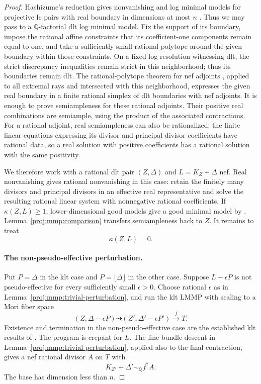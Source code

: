 \documentclass[11pt,letterpaper]{article}
\newcommand{\Q}{\mathbb{Q}}
\theoremstyle{definition}
\theoremstyle{remark}
\begin{document}
\begin{proof}
Hashizume's reduction gives nonvanishing and log minimal models
for projective lc pairs with real boundary in dimensions at most
\(n\) \cite[Theorem~1.4]{Proj-Hashizume2018}.
Thus we may pass to a \(\Q\)-factorial dlt log minimal model.
Fix the support of its boundary, impose the rational affine
constraints that its coefficient-one components remain equal
to one, and take a sufficiently small rational polytope around
the given boundary within those constraints. On a fixed log
resolution witnessing dlt, the strict discrepancy inequalities
remain strict in this neighborhood; thus its boundaries remain
dlt. The rational-polytope theorem for nef adjoints
\cite[Remark~3.1 and Proposition~3.2(3)]{Proj-Birkar2011II}, applied
to all extremal rays and intersected with this neighborhood,
expresses the given real boundary in a finite rational simplex
of dlt boundaries with nef adjoints.
It is enough to prove semiampleness for these
rational adjoints. Their positive real combinations are
semiample, using the product of the associated contractions.
For a rational adjoint, real semiampleness can also be
rationalized: the finite linear equations expressing its
divisor and principal-divisor coefficients have rational data,
so a real solution with positive coefficients has a rational
solution with the same positivity.

We therefore work with a rational dlt pair \((Z,\Delta)\) and
\(L=K_Z+\Delta\) nef.
Real nonvanishing gives rational nonvanishing in this case:
retain the finitely many divisors and principal divisors in
an effective real representative and solve the resulting
rational linear system with nonnegative rational coefficients.
If \(\kappa(Z,L)\geq 1\), lower-dimensional good models give a
good minimal model by \cite[Lemma~3.5]{Proj-FujinoGongyoRings2014}.
Lemma~\ref{proj:mmp:comparison} transfers semiampleness back to \(Z\).
It remains to treat
\[
 \kappa(Z,L)=0.
\]

\paragraph{The non-pseudo-effective perturbation.}
Put \(P=\Delta\) in the klt case and
\(P=\lfloor\Delta\rfloor\) in the other case.
Suppose \(L-\epsilon P\) is not pseudo-effective for every
sufficiently small \(\epsilon>0\).
Choose rational \(\epsilon\) as in
Lemma~\ref{proj:mmp:trivial-perturbation}, and run the klt LMMP
with scaling to a Mori fiber space
\[
 (Z,\Delta-\epsilon P)\dashrightarrow
 (Z',\Delta'-\epsilon P')\xrightarrow{f} T.
\]
Existence and termination in the non-pseudo-effective case are
the established klt results of \cite{BCHM}.
The program is crepant for \(L\).
The line-bundle descent in
Lemma~\ref{proj:mmp:trivial-perturbation}, applied also to the final
contraction, gives a nef rational divisor \(A\) on \(T\) with
\[
 K_{Z'}+\Delta'\sim_{\Q}f^*A.
\]
The base has dimension less than \(n\).


\end{proof}
\end{document}
